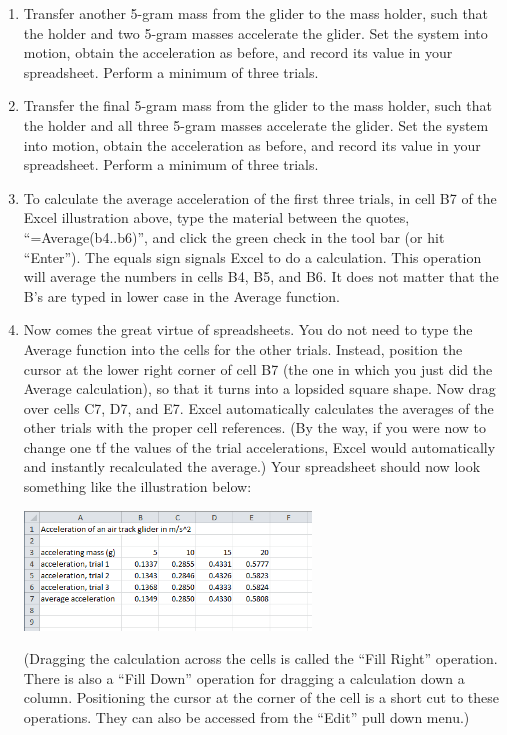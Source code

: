 \begin{enumerate}[label=\arabic*.]
\item Transfer another 5-gram mass from the glider to the mass holder, such that the holder and two 5-gram masses accelerate the glider.  Set the system into motion, obtain the acceleration as before, and record its value in your spreadsheet.  Perform a minimum of three trials.

\item Transfer the final 5-gram mass from the glider to the mass holder, such that the holder and all three 5-gram masses accelerate the glider.  Set the system into motion, obtain the acceleration as before, and record its value in your spreadsheet.  Perform a minimum of three trials.

\item To calculate the average acceleration of the first three trials, in cell B7 of the Excel illustration above, type the material between the quotes, ``=Average(b4..b6)'', and click the green check in the tool bar (or hit ``Enter'').  The equals sign signals Excel to do a calculation.  This operation will average the numbers in cells B4, B5, and B6.  It does not matter that the B's are typed in lower case in the Average function.

\item Now comes the great virtue of spreadsheets.  You do not need to type the Average function into the cells for the other trials.  Instead, position the cursor at the lower right corner of cell B7 (the one in which you just did the Average calculation), so that it turns into a lopsided square shape.  Now drag over cells C7, D7, and E7.  Excel automatically calculates the averages of the other trials with the proper cell references.  (By the way, if you were now to change one tf the values of the trial accelerations, Excel would automatically and instantly recalculated the average.)  Your spreadsheet should now look something like the illustration below:
\begin{center} \includegraphics*[width=0.6\textwidth]{imgs/6labs/6Alab/6Aexp3/6A_exp3_Excel_Spreadsheet2.png} \end{center}
(Dragging the calculation across the cells is called the ``Fill Right'' operation.  There is also a ``Fill Down'' operation for dragging a calculation down a column.  Positioning the cursor at the corner of the cell is a short cut to these operations.  They can also be accessed from the ``Edit'' pull down menu.)


\end{enumerate}
